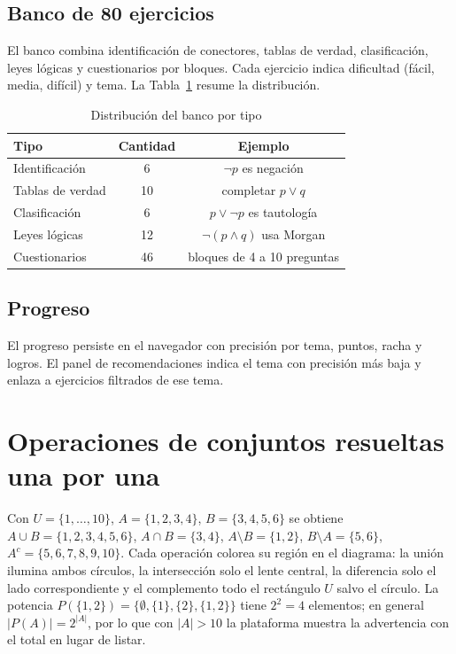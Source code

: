 \documentclass[11pt,a4paper,openany]{book}
\begin{document}
\section{Banco de 80 ejercicios}
El banco combina identificaci\'on de conectores, tablas de verdad, clasificaci\'on, leyes l\'ogicas y cuestionarios por bloques. Cada ejercicio indica dificultad (f\'acil, media, dif\'icil) y tema. La Tabla~\ref{tab:banco} resume la distribuci\'on.
\begin{table}[H]
\centering
\caption{Distribuci\'on del banco por tipo}
\label{tab:banco}
\begin{tabular}{lcc}
\toprule
Tipo & Cantidad & Ejemplo \\
\midrule
Identificaci\'on & 6 & $\lnot p$ es negaci\'on \\
Tablas de verdad & 10 & completar $p \lor q$ \\
Clasificaci\'on & 6 & $p \lor \lnot p$ es tautolog\'ia \\
Leyes l\'ogicas & 12 & $\lnot(p \land q)$ usa Morgan \\
Cuestionarios & 46 & bloques de 4 a 10 preguntas \\
\bottomrule
\end{tabular}
\end{table}
\section{Progreso}
El progreso persiste en el navegador con precisi\'on por tema, puntos, racha y logros. El panel de recomendaciones indica el tema con precisi\'on m\'as baja y enlaza a ejercicios filtrados de ese tema.
\chapter{Operaciones de conjuntos resueltas una por una}
\label{ch:conj-res}
Con $U = \{1,\ldots,10\}$, $A = \{1,2,3,4\}$, $B = \{3,4,5,6\}$ se obtiene $A \cup B = \{1,2,3,4,5,6\}$, $A \cap B = \{3,4\}$, $A \setminus B = \{1,2\}$, $B \setminus A = \{5,6\}$, $A^{c} = \{5,6,7,8,9,10\}$. Cada operaci\'on colorea su regi\'on en el diagrama: la uni\'on ilumina ambos c\'irculos, la intersecci\'on solo el lente central, la diferencia solo el lado correspondiente y el complemento todo el rect\'angulo $U$ salvo el c\'irculo. La potencia $P(\{1,2\}) = \{\emptyset, \{1\}, \{2\}, \{1,2\}\}$ tiene $2^{2} = 4$ elementos; en general $|P(A)| = 2^{|A|}$, por lo que con $|A| > 10$ la plataforma muestra la advertencia con el total en lugar de listar.
\end{document}
